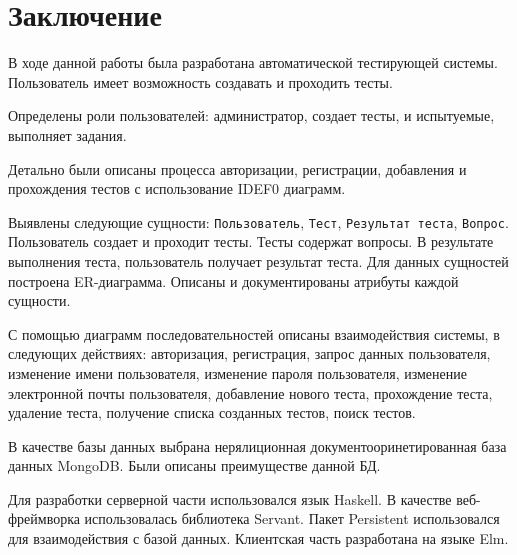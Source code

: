 \chapter{Заключение}
В ходе данной работы была разработана автоматической тестирующей системы. Пользователь имеет возможность создавать и проходить тесты.

Определены роли пользователей: администратор, создает тесты, и испытуемые, выполняет задания. 

Детально были описаны процесса авторизации, регистрации, добавления и прохождения тестов с использование IDEF0 диаграмм. 

Выявлены следующие сущности: \texttt{Пользователь}, \texttt{Тест}, \texttt{Результат теста}, \texttt{Вопрос}. Пользователь создает и проходит тесты. Тесты содержат вопросы. В результате выполнения теста, пользователь получает результат теста. Для данных сущностей построена ER-диаграмма. Описаны и документированы атрибуты каждой сущности.

С помощью диаграмм последовательностей описаны взаимодействия системы, в следующих действиях: авторизация, регистрация, запрос данных пользователя, изменение имени пользователя, изменение пароля пользователя, изменение электронной почты пользователя, добавление нового теста, прохождение теста, удаление теста, получение списка созданных тестов, поиск тестов.

В качестве базы данных выбрана нерялиционная документооринетированная база данных MongoDB. Были описаны преимуществе данной БД.

Для разработки серверной части использовался язык Haskell. В качестве веб-фреймворка использовалась библиотека Servant. Пакет Persistent использовался для взаимодействия с базой данных. Клиентская часть разработана на языке Elm.
